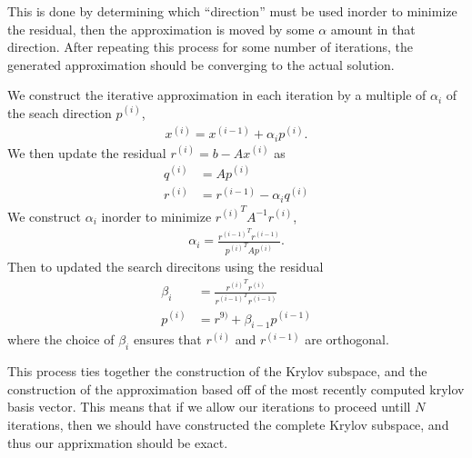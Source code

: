 \documentclass[../fem.tex]{subfiles}
\begin{document}
\begin{Figure}
   \begin{center}
     
   \end{center}
   \label{fig:cg_time}
\end{Figure}

This is done by determining which ``direction'' must be used inorder to
minimize the residual, then the approximation is moved by some $\alpha$ amount
in that direction. After repeating this process for some number of iterations,
the generated approximation should be converging to the actual solution.

\begin{Figure}
   \begin{center}
     
   \end{center}
   \label{fig:cg_err}
\end{Figure}

We construct the iterative approximation in each iteration by a multiple of
$\alpha_i$ of the seach direction $p^{(i)}$,
\begin{align*}
  x^{(i)}=x^{(i-1)}+\alpha_ip^{(i)}.
\end{align*}
We then update the residual $r^{(i)}=b-Ax^{(i)}$ as
\begin{align*}
  q^{(i)}&=Ap^{(i)}\\
  r^{(i)}&=r^{(i-1)}-\alpha_i q^{(i)}
\end{align*}
We construct $\alpha_i$ inorder to minimize ${r^{(i)}}^TA^{-1}r^{(i)}$,
\begin{align*}
  \alpha_i=\frac{{r^{(i-1)}}^Tr^{(i-1)}}{{p^{(i)}}^TAp^{(i)}}.
\end{align*}
Then to updated the search direcitons using the residual
\begin{align*}
  \beta_i&=\frac{{r^{(i)}}^Tr^{(i)}}{{r^{(i-1)}}^Tr^{(i-1)}}\\
  p^{(i)}&=r^{9)}+\beta_{i-1}p^{(i-1)}
\end{align*}
where the choice of $\beta_i$ ensures that $r^{(i)}$ and $r^{(i-1)}$ are
orthogonal.

This process ties together the construction of the Krylov subspace, and the
construction of the approximation based off of the most recently computed
krylov basis vector. This means that if we allow our iterations to proceed
untill $N$ iterations, then we should have constructed the complete Krylov
subspace, and thus our apprixmation should be exact.
\end{document}
